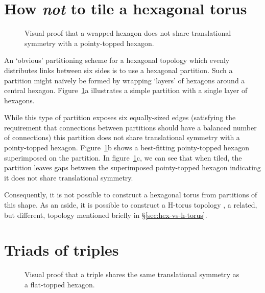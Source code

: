 	
	\section{How \emph{not} to tile a hexagonal torus}
		
		\begin{figure}[h]
			\center
			
			\caption[A wraped hexagon does not tile a hexagonal torus.]%
			{Visual proof that a wrapped hexagon does not share translational
			symmetry with a pointy-topped hexagon.}
			\label{fig:wrapped-hexagon-tiling}
		\end{figure}
	
		An `obvious' partitioning scheme for a hexagonal topology which evenly
		distributes links between six sides is to use a hexagonal partition. Such a
		partition might na\"ively be formed by wrapping `layers' of hexagons around
		a central hexagon. Figure~\ref{fig:wrapped-hexagon-tiling}a illustrates a
		simple partition with a single layer of hexagons.
	
		While this type of partition exposes six equally-sized edges (satisfying
		the requirement that connections between partitions should have a balanced
		number of connections) this partition does not share translational symmetry
		with a pointy-topped hexagon. Figure~\ref{fig:wrapped-hexagon-tiling}b
		shows a best-fitting pointy-topped hexagon superimposed on the partition.
		In figure~\ref{fig:wrapped-hexagon-tiling}c, we can see that when tiled,
		the partition leaves gaps between the superimposed pointy-topped hexagon
		indicating it does not share translational symmetry.
		
		Consequently, it is not possible to construct a hexagonal torus from
		partitions of this shape. As an aside, it is possible to construct a
		H-torus topology \cite{zhao08}, a related, but different, topology
		mentioned briefly in \S\ref{sec:hex-vs-h-torus}.
	
	\section{Triads of triples}
		
		\begin{figure}
			\center
			
			\caption[Triples share translational symetry with flat-topped hexagons.]%
			{Visual proof that a triple shares the same translational
			symmetry as a flat-topped hexagon.}
			\label{fig:wrapped-triple-tiling}
		\end{figure}
		
